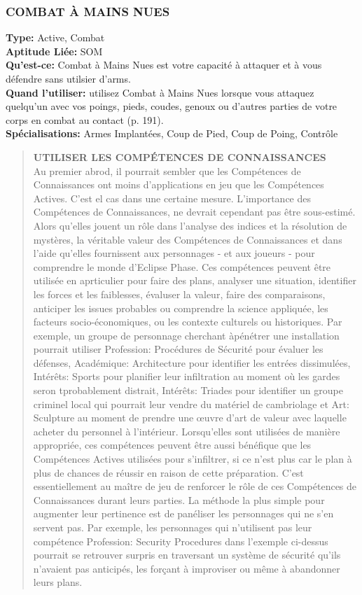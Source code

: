 \subsubsection{COMBAT À MAINS NUES} \textbf{Type:} Active, Combat \\ \textbf{Aptitude Liée:} SOM \\ \textbf{Qu'est-ce:} Combat à Mains Nues est votre capacité à attaquer et à vous défendre sans utilsier d'arms. \\ \textbf{Quand l'utiliser:} utilisez Combat à Mains Nues lorsque vous attaquez quelqu'un avec vos poings, pieds, coudes, genoux ou d'autres parties de votre corps en combat au contact (p. 191). \\ \textbf{Spécialisations:} Armes Implantées, Coup de Pied, Coup de Poing, Contrôle 

\begin{quotation} \textbf{UTILISER LES COMPÉTENCES DE CONNAISSANCES } \\ Au premier abrod, il pourrait sembler que les Compétences de Connaissances ont moins d'applications en jeu que les Compétences Actives. C'est el cas dans une certaine mesure. L'importance des Compétences de Connaissances, ne devrait cependant pas être sous-estimé. Alors qu'elles jouent un rôle dans l'analyse des indices et la résolution de  mystères, la véritable valeur des Compétences de Connaissances et dans l'aide qu'elles fournissent aux personnages - et aux joueurs - pour comprendre le monde d'Eclipse Phase. Ces compétences peuvent être utilisée en aprticulier pour faire des plans, analyser une situation, identifier les forces et les faiblesses, évaluser la valeur, faire des comparaisons, anticiper les issues probables ou comprendre la science appliquée, les facteurs socio-économiques, ou les contexte culturels ou historiques. Par exemple, un groupe de personnage cherchant àpénétrer une installation pourrait utiliser Profession: Procédures de Sécurité pour évaluer les défenses, Académique: Architecture pour identifier les entrées dissimulées, Intérêts: Sports pour planifier leur infiltration au moment où les gardes seron tprobablement distrait, Intérêts: Triades pour identifier un groupe criminel local qui pourrait leur vendre du matériel de cambriolage et Art: Sculpture au moment de prendre une œuvre d'art de valeur avec laquelle acheter du personnel à l'intérieur. Lorsqu'elles sont utilisées de manière appropriée, ces compétences peuvent être aussi bénéfique que les Compétences Actives utilisées pour s'infiltrer, si ce n'est plus car le plan à plus de chances de réussir en raison de cette préparation. C'est essentiellement au maître de jeu de renforcer le rôle de ces Compétences de Connaissances durant leurs parties. La méthode la plus simple pour augmenter leur pertinence est de panéliser les personnages qui ne s'en servent pas. Par exemple, les personnages qui n'utilisent pas leur compétence Profession: Security Procedures dans l'exemple ci-dessus pourrait se retrouver surpris en traversant un système de sécurité qu'ils n'avaient pas anticipés, les forçant à improviser ou même à abandonner leurs plans. \end{quotation} 

